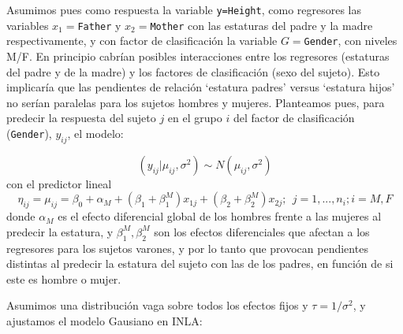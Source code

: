 \documentclass[
]{book}
\newenvironment{Shaded}{\begin{snugshade}}{\end{snugshade}}
\newcommand{\AttributeTok}[1]{\textcolor[rgb]{0.77,0.63,0.00}{#1}}
\newcommand{\CommentTok}[1]{\textcolor[rgb]{0.56,0.35,0.01}{\textit{#1}}}
\newcommand{\DecValTok}[1]{\textcolor[rgb]{0.00,0.00,0.81}{#1}}
\newcommand{\FunctionTok}[1]{\textcolor[rgb]{0.00,0.00,0.00}{#1}}
\newcommand{\NormalTok}[1]{#1}
\newcommand{\OtherTok}[1]{\textcolor[rgb]{0.56,0.35,0.01}{#1}}
\newcommand{\SpecialCharTok}[1]{\textcolor[rgb]{0.00,0.00,0.00}{#1}}
\newcommand{\StringTok}[1]{\textcolor[rgb]{0.31,0.60,0.02}{#1}}
\begin{document}
Asumimos pues como respuesta la variable \texttt{y=Height}, como regresores las variables \(x_1=\)\texttt{Father} y \(x_2=\)\texttt{Mother} con las estaturas del padre y la madre respectivamente, y con factor de clasificación la variable \(G=\)\texttt{Gender}, con niveles M/F. En principio cabrían posibles interacciones entre los regresores (estaturas del padre y de la madre) y los factores de clasificación (sexo del sujeto). Esto implicaría que las pendientes de relación `estatura padres' versus `estatura hijos' no serían paralelas para los sujetos hombres y mujeres. Planteamos pues, para predecir la respuesta del sujeto \(j\) en el grupo \(i\) del factor de clasificación (\texttt{Gender}), \(y_{ij}\), el modelo:

\[(y_{ij}|\mu_{ij},\sigma^2) \sim N(\mu_{ij},\sigma^2)\]
con el predictor lineal
\[\eta_{ij}=\mu_{ij}=\beta_0+ \alpha_M+ (\beta_1 + \beta_1^M) x_{1j} + (\beta_2+ \beta_2^M) x_{2j} ;\ \  j =1,...,n_i; i=M,F\]
donde \(\alpha_M\) es el efecto diferencial global de los hombres frente a las mujeres al predecir la estatura, y \(\beta_1^M, \beta_2^M\) son los efectos diferenciales que afectan a los regresores para los sujetos varones, y por lo tanto que provocan pendientes distintas al predecir la estatura del sujeto con las de los padres, en función de si este es hombre o mujer.

Asumimos una distribución vaga sobre todos los efectos fijos y \(\tau=1/\sigma^2\), y ajustamos el modelo Gausiano en INLA:

\begin{Shaded}
\end{Shaded}
\end{document}

